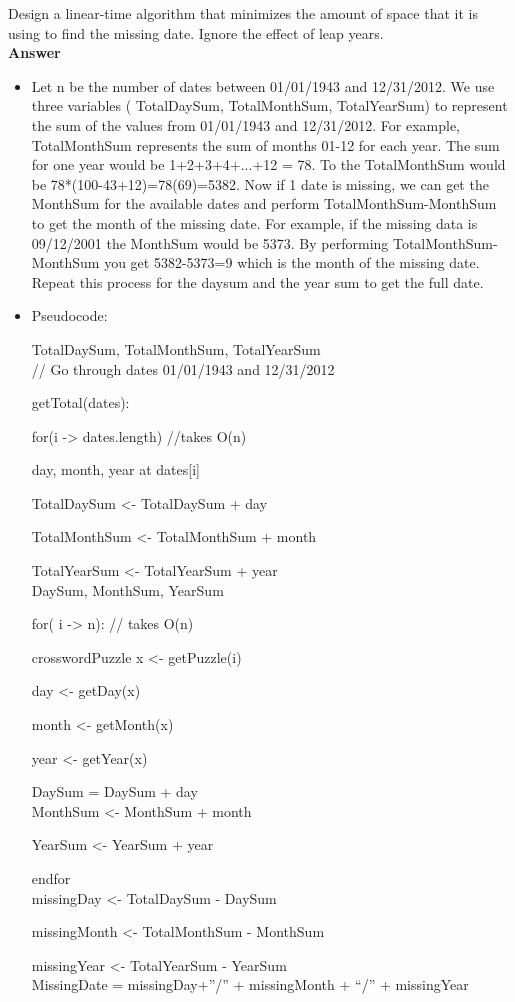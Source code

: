 \documentclass{article}
\begin{document}
Design a linear-time algorithm that minimizes the amount of space that
it is using to find the missing date. Ignore the effect of leap years.\\

\textbf{ Answer }
\begin{itemize}
\item Let n be the number of dates between 01/01/1943 and 12/31/2012. We use three variables ( TotalDaySum, TotalMonthSum, TotalYearSum) to represent the sum of the values from 01/01/1943 and 12/31/2012. For example, TotalMonthSum represents the sum of months 01-12 for each year. The sum for one year would be 1+2+3+4+...+12 =  78. To the TotalMonthSum would be 78*(100-43+12)=78(69)=5382. Now if 1 date is missing, we can get the MonthSum for the available dates and perform TotalMonthSum-MonthSum to get the month of the missing date. For example, if the missing data is 09/12/2001 the MonthSum would be 5373. By performing TotalMonthSum-MonthSum you get 5382-5373=9 which is the month of the missing date. Repeat this process for the daysum and the year sum to get the full date. 

\item Pseudocode:

TotalDaySum, TotalMonthSum, TotalYearSum\\

// Go through dates 01/01/1943 and 12/31/2012

getTotal(dates): 

\qquad for(i -> dates.length)  //takes O(n)

\qquad \qquad day, month, year at dates[i]

\qquad \qquad TotalDaySum <- TotalDaySum + day

\qquad \qquad TotalMonthSum <- TotalMonthSum + month

\qquad \qquad TotalYearSum <- TotalYearSum + year\\
	
DaySum, MonthSum, YearSum

for( i -> n): // takes O(n)

\qquad crosswordPuzzle x <- getPuzzle(i)

\qquad day <- getDay(x)

\qquad month <- getMonth(x)

\qquad year <- getYear(x)

\qquad DaySum = DaySum + day\\

\qquad MonthSum <- MonthSum + month

\qquad YearSum <- YearSum + year

endfor\\

missingDay <- TotalDaySum - DaySum

missingMonth <- TotalMonthSum - MonthSum

missingYear <- TotalYearSum - YearSum\\

MissingDate = missingDay+”/” + missingMonth + “/” + missingYear

\end{itemize}
\end{document}
